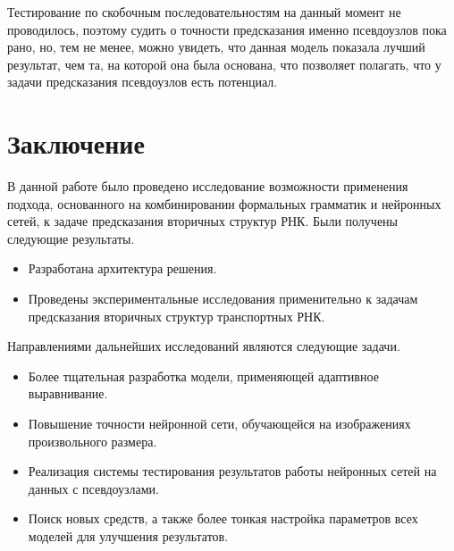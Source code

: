 \documentclass[14pt]{matmex-diploma-custom}
\begin{document}


Тестирование по скобочным последовательностям на данный момент не проводилось, поэтому судить о точности предсказания именно псевдоузлов пока рано, но, тем не менее, можно увидеть, что данная модель показала лучший результат, чем та, на которой она была основана, что позволяет полагать, что у задачи предсказания псевдоузлов есть потенциал.

\section*{Заключение}
В данной работе было проведено исследование возможности применения подхода, основанного на комбинировании формальных грамматик и нейронных сетей, к задаче предсказания вторичных структур РНК. Были получены следующие результаты.
\begin{itemize}
    \item Разработана архитектура решения.
    \item Проведены экспериментальные исследования применительно к задачам предсказания вторичных структур транспортных РНК.
\end{itemize}

Направлениями дальнейших исследований являются следующие задачи.
\begin{itemize}
    \item Более тщательная разработка модели, применяющей адаптивное выравнивание.
    \item Повышение точности нейронной сети, обучающейся на изображениях произвольного размера.
    \item Реализация системы тестирования результатов работы нейронных сетей на данных с псевдоузлами.
    \item Поиск новых средств, а также более тонкая настройка параметров всех моделей для улучшения результатов.
\end{itemize}

\setmonofont[Mapping=tex-text]{CMU Typewriter Text}

\renewcommand\refname{Список литературы}

\end{document}
